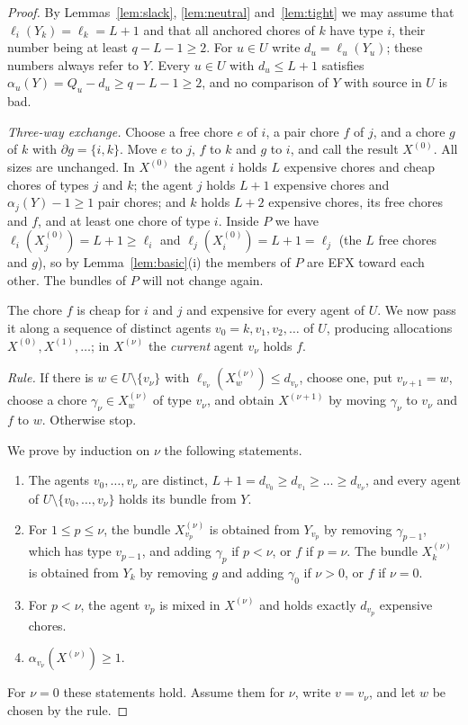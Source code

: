 \documentclass{amsart}
\numberwithin{equation}{section}
\theoremstyle{definition}
\theoremstyle{remark}
\newcommand{\bd}{\partial}
\begin{document}
\begin{proof}
By Lemmas~\ref{lem:slack}, \ref{lem:neutral} and~\ref{lem:tight} we may assume that $\ell_i(Y_k)=\ell_k=L+1$ and that all anchored chores of $k$ have type $i$, their number being at least $q-L-1\ge2$. For $u\in U$ write $d_u=\ell_u(Y_u)$; these numbers always refer to $Y$. Every $u\in U$ with $d_u\le L+1$ satisfies $\alpha_u(Y)=Q_u-d_u\ge q-L-1\ge2$, and no comparison of $Y$ with source in $U$ is bad.

\emph{Three-way exchange.} Choose a free chore $e$ of $i$, a pair chore $f$ of $j$, and a chore $g$ of $k$ with $\bd g=\{i,k\}$. Move $e$ to $j$, $f$ to $k$ and $g$ to $i$, and call the result $X^{(0)}$. All sizes are unchanged. In $X^{(0)}$ the agent $i$ holds $L$ expensive chores and cheap chores of types $j$ and $k$; the agent $j$ holds $L+1$ expensive chores and $\alpha_j(Y)-1\ge1$ pair chores; and $k$ holds $L+2$ expensive chores, its free chores and $f$, and at least one chore of type $i$. Inside $P$ we have $\ell_i(X^{(0)}_j)=L+1\ge\ell_i$ and $\ell_j(X^{(0)}_i)=L+1=\ell_j$ (the $L$ free chores and $g$), so by Lemma~\ref{lem:basic}(i) the members of $P$ are EFX toward each other. The bundles of $P$ will not change again.

The chore $f$ is cheap for $i$ and $j$ and expensive for every agent of $U$. We now pass it along a sequence of distinct agents $v_0=k,v_1,v_2,\dots$ of $U$, producing allocations $X^{(0)},X^{(1)},\dots$; in $X^{(\nu)}$ the \emph{current} agent $v_\nu$ holds $f$.

\emph{Rule.} If there is $w\in U\setminus\{v_\nu\}$ with $\ell_{v_\nu}(X^{(\nu)}_w)\le d_{v_\nu}$, choose one, put $v_{\nu+1}=w$, choose a chore $\gamma_\nu\in X^{(\nu)}_w$ of type $v_\nu$, and obtain $X^{(\nu+1)}$ by moving $\gamma_\nu$ to $v_\nu$ and $f$ to $w$. Otherwise stop.

We prove by induction on $\nu$ the following statements.
\begin{enumerate}[label=(W\arabic*)]
\item The agents $v_0,\dots,v_\nu$ are distinct, $L+1=d_{v_0}\ge d_{v_1}\ge\dots\ge d_{v_\nu}$, and every agent of $U\setminus\{v_0,\dots,v_\nu\}$ holds its bundle from $Y$.
\item For $1\le p\le \nu$, the bundle $X^{(\nu)}_{v_p}$ is obtained from $Y_{v_p}$ by removing $\gamma_{p-1}$, which has type $v_{p-1}$, and adding $\gamma_p$ if $p<\nu$, or $f$ if $p=\nu$. The bundle $X^{(\nu)}_k$ is obtained from $Y_k$ by removing $g$ and adding $\gamma_0$ if $\nu >0$, or $f$ if $\nu =0$.
\item For $p<\nu$, the agent $v_p$ is mixed in $X^{(\nu)}$ and holds exactly $d_{v_p}$ expensive chores.
\item $\alpha_{v_\nu}(X^{(\nu)})\ge1$.
\end{enumerate}
For $\nu =0$ these statements hold. Assume them for $\nu$, write $v=v_\nu$, and let $w$ be chosen by the rule.


\end{proof}
\end{document}
